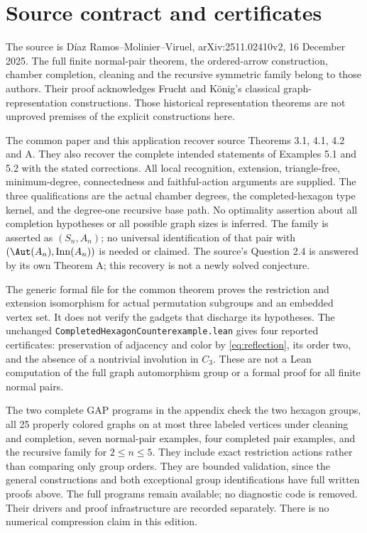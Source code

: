\section{Source contract and certificates}
\label{sec:scope}
The source is D\'iaz Ramos--Molinier--Viruel, arXiv:2511.02410v2,
16 December 2025. The full finite normal-pair theorem, the ordered-arrow
construction, chamber completion, cleaning and the recursive symmetric family
belong to those authors. Their proof acknowledges Frucht and K\"onig's
classical graph-representation constructions. Those historical representation
theorems are not unproved premises of the explicit constructions here.

The common paper and this application recover source Theorems 3.1, 4.1, 4.2
and A. They also recover the complete intended statements of Examples 5.1
and 5.2 with the stated corrections. All local recognition, extension,
triangle-free, minimum-degree, connectedness and faithful-action arguments
are supplied. The three qualifications are the actual chamber degrees,
the completed-hexagon type kernel, and the degree-one recursive base path.
No optimality assertion about all completion hypotheses or all possible
graph sizes is inferred. The family is asserted as $(S_n,A_n)$; no universal
identification of that pair with $(\Aut(A_n),\operatorname{Inn}(A_n))$ is
needed or claimed. The source's Question 2.4 is answered by its own
Theorem A; this recovery is not a newly solved conjecture.

The generic formal file for the common theorem proves the restriction and
extension isomorphism for actual permutation subgroups and an embedded
vertex set. It does not verify the gadgets that discharge its hypotheses.
The unchanged \texttt{CompletedHexagonCounterexample.lean} gives four
reported certificates: preservation of adjacency and color by
\eqref{eq:reflection}, its order two, and the absence of a nontrivial
involution in $C_3$. These are not a Lean computation of the full graph
automorphism group or a formal proof for all finite normal pairs.

The two complete GAP programs in the appendix check the two hexagon groups,
all 25 properly colored graphs on at most three labeled vertices under
cleaning and completion, seven normal-pair examples, four completed pair
examples, and the recursive family for $2\leq n\leq5$. They include exact
restriction actions rather than comparing only group orders. They are
bounded validation, since the general constructions and both exceptional
group identifications have full written proofs above. The full programs
remain available; no diagnostic code is removed. Their drivers and proof
infrastructure are recorded separately. There is no numerical compression
claim in this edition.

